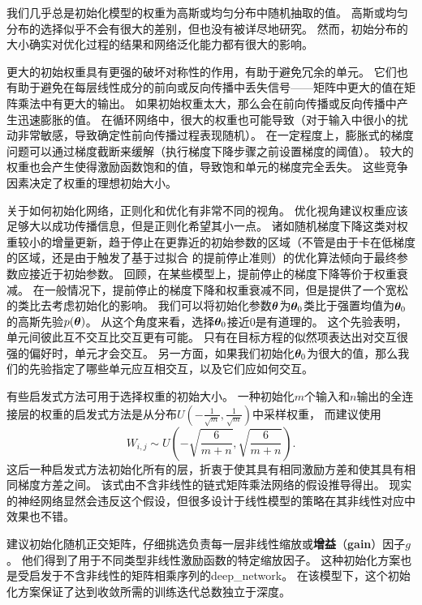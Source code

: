 我们几乎总是初始化模型的权重为高斯或均匀分布中随机抽取的值。
高斯或均匀分布的选择似乎不会有很大的差别，但也没有被详尽地研究。
然而，初始分布的大小确实对优化过程的结果和网络泛化能力都有很大的影响。


更大的初始权重具有更强的破坏对称性的作用，有助于避免冗余的单元。
它们也有助于避免在每层线性成分的前向或反向传播中丢失信号——矩阵中更大的值在矩阵乘法中有更大的输出。
如果初始权重太大，那么会在前向传播或反向传播中产生迅速膨胀的值。
在循环网络中，很大的权重也可能导致（对于输入中很小的扰动非常敏感，导致确定性前向传播过程表现随机）。
在一定程度上，膨胀式的梯度问题可以通过梯度截断来缓解（执行梯度下降步骤之前设置梯度的阈值）。
较大的权重也会产生使得激励函数饱和的值，导致饱和单元的梯度完全丢失。
这些竞争因素决定了权重的理想初始大小。

关于如何初始化网络，正则化和优化有非常不同的视角。
优化视角建议权重应该足够大以成功传播信息，但是正则化希望其小一点。
诸如随机梯度下降这类对权重较小的增量更新，趋于停止在更靠近的初始参数的区域（不管是由于卡在低梯度的区域，还是由于触发了基于过拟合 的提前停止准则）的优化算法倾向于最终参数应接近于初始参数。
回顾，在某些模型上，提前停止的梯度下降等价于权重衰减。
在一般情况下，提前停止的梯度下降和权重衰减不同，但是提供了一个宽松的类比去考虑初始化的影响。
我们可以将初始化参数$\boldsymbol{\theta}$为$\boldsymbol{\theta}_0$类比于强置均值为$\boldsymbol{\theta}_0$的高斯先验$p(\boldsymbol{\theta})$。
从这个角度来看，选择$\boldsymbol{\theta}_0$接近$0$是有道理的。
这个先验表明，单元间彼此互不交互比交互更有可能。
只有在目标方程的似然项表达出对交互很强的偏好时，单元才会交互。
另一方面，如果我们初始化$\boldsymbol{\theta}_0$为很大的值，那么我们的先验指定了哪些单元应互相交互，以及它们应如何交互。

有些启发式方法可用于选择权重的初始大小。
一种初始化$m$个输入和$n$输出的全连接层的权重的启发式方法是从分布$U(-\frac{1}{\sqrt{m}}, \frac{1}{\sqrt{m}})$中采样权重，
而\cite{Glorot+al-AI-2011-small}建议使用
\begin{equation}
    W_{i,j} \sim U \left(-\sqrt{\frac{6}{m+n}}, \sqrt{\frac{6}{m+n}}\right) .
\end{equation}
这后一种启发式方法初始化所有的层，折衷于使其具有相同激励方差和使其具有相同梯度方差之间。
该式由不含非线性的链式矩阵乘法网络的假设推导得出。
现实的神经网络显然会违反这个假设，但很多设计于线性模型的策略在其非线性对应中效果也不错。


\cite{Saxe-et-al-ICLR13}建议初始化随机正交矩阵，仔细挑选负责每一层非线性缩放或\textbf{增益}（\textbf{gain}）因子$g$。
他们得到了用于不同类型非线性激励函数的特定缩放因子。
这种初始化方案也是受启发于不含非线性的矩阵相乘序列的\gls{deep_network}。
在该模型下，这个初始化方案保证了达到收敛所需的训练迭代总数独立于深度。

